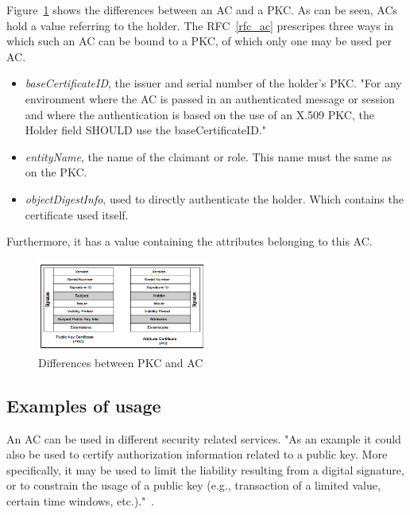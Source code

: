 \documentclass[10pt,conference,a4paper]{IEEEtran}
\begin{document}
 Figure~\ref{fig:diff} shows the differences between an AC and a PKC. As can be seen, ACs hold a value referring to the holder. The RFC~\ref{rfc_ac} prescripes three ways in which such an AC can be bound to a PKC, of which only one may be used per AC.
\begin{itemize}
	\item \textit{baseCertificateID}, the issuer and serial number of the holder's PKC. "For any environment where the AC is passed in an authenticated message or session and where the authentication is based on the use of an X.509 PKC, the Holder field SHOULD use the baseCertificateID."~\cite{rfc_ac}
	\item \textit{entityName}, the name of the claimant or role. This name must the same as on the PKC.
	\item \textit{objectDigestInfo}, used to directly authenticate the holder. Which contains the certificate used itself.
\end{itemize}
Furthermore, it has a value containing the attributes belonging to this AC.

\begin{figure}[h]
	\centering
	\includegraphics[width=0.5\textwidth]{diff.png}
	\caption{Differences between PKC and AC~\cite{godavari2001secure}}
	\label{fig:diff}
\end{figure}

\subsection{Examples of usage}
An AC can be used in different security related services. "As an example it could also be used to certify authorization information related to a public key. More specifically, it may be used to limit the liability resulting from a digital signature, or to constrain the usage of a public key (e.g., transaction of a limited value, certain time windows, etc.)."~\cite{tilborg2011encyclopedia}.
\end{document}
